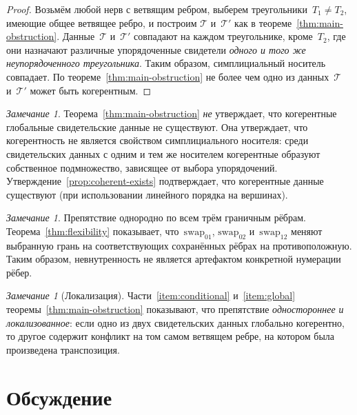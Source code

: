 \documentclass[11pt,a4paper]{article}
\theoremstyle{plain}
\theoremstyle{definition}
\theoremstyle{remark}
\newtheorem{remark}[theorem]{Замечание}
\newcommand{\cT}{\mathcal{T}}
\newcommand{\swapAB}{\mathrm{swap}_{01}}
\newcommand{\swapAC}{\mathrm{swap}_{02}}
\newcommand{\swapBC}{\mathrm{swap}_{12}}
\begin{document}
\begin{proof}
Возьмём любой нерв с ветвящим ребром, выберем
треугольники~$T_1 \neq T_2$, имеющие общее ветвящее ребро, и построим
$\cT$ и~$\cT'$ как в теореме~\ref{thm:main-obstruction}. Данные~$\cT$
и~$\cT'$ совпадают на каждом треугольнике, кроме~$T_2$, где они
назначают различные упорядоченные свидетели \emph{одного и того же
неупорядоченного треугольника}. Таким образом, симплициальный носитель
совпадает. По теореме~\ref{thm:main-obstruction} не более чем одно
из данных~$\cT$ и~$\cT'$ может быть когерентным.
\end{proof}

\begin{remark}
\label{rem:not-impossibility}
Теорема~\ref{thm:main-obstruction} \emph{не} утверждает, что когерентные
глобальные свидетельские данные не существуют. Она утверждает, что
когерентность не является свойством симплициального носителя: среди
свидетельских данных с одним и тем же носителем когерентные образуют
собственное подмножество, зависящее от выбора упорядочений.
Утверждение~\ref{prop:coherent-exists} подтверждает, что когерентные
данные существуют (при использовании линейного порядка на вершинах).
\end{remark}

\begin{remark}
\label{rem:all-edges}
Препятствие однородно по всем трём граничным рёбрам.
Теорема~\ref{thm:flexibility} показывает, что~$\swapAB$, $\swapAC$
и~$\swapBC$ меняют выбранную грань на соответствующих сохранённых рёбрах
на противоположную. Таким образом, невнутренность не является артефактом
конкретной нумерации рёбер.
\end{remark}

\begin{remark}[Локализация]
\label{rem:localization}
Части~\ref{item:conditional} и~\ref{item:global}
теоремы~\ref{thm:main-obstruction} показывают, что препятствие
\emph{одностороннее и локализованное}: если одно из двух свидетельских
данных глобально когерентно, то другое содержит конфликт на том самом
ветвящем ребре, на котором была произведена транспозиция.
\end{remark}

\section{Обсуждение}
\label{sec:discussion}
\end{document}
